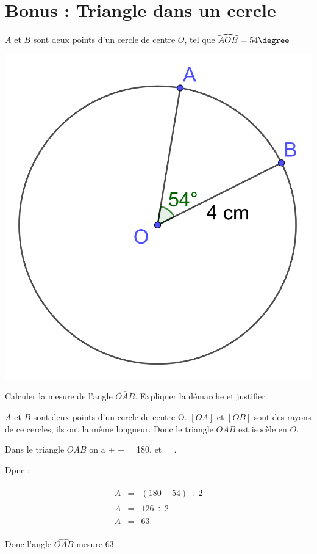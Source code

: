 \section*{Bonus : Triangle dans un cercle}

$A$ et $B$ sont deux points d'un cercle de centre $O$, tel que $\widehat{AOB}=54\degree$

\begin{center}
	\includegraphics[scale=0.15]{img/cercle}
\end{center}

\begin{questions}
	\question Calculer la mesure de l'angle $\widehat{OAB}$. Expliquer la démarche et justifier.
\end{questions}
\begin{solution}
	$A$ et $B$ sont deux points d'un cercle de centre O. $[OA]$ et $[OB]$ sont des rayons de ce cercles, ils ont la même longueur. Donc le triangle $OAB$ est isocèle en $O$.
	
	Dans le triangle $OAB$ on a  +  +  = 180\degree, et  = .
	
	Dpnc : 
	
	\begin{eqnarray*}
		\widehat{A} &=& (180 - 54) \div 2\\
		\widehat{A} &=& 126 \div 2 \\
		\widehat{A} &=& 63 \\
	\end{eqnarray*}

Donc l'angle $\widehat{OAB}$ mesure 63\degree.
\end{solution}